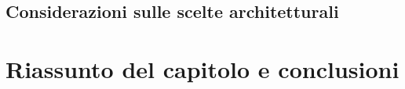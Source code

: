 \subsection{Considerazioni sulle scelte architetturali}


\section{Riassunto del capitolo e conclusioni}

